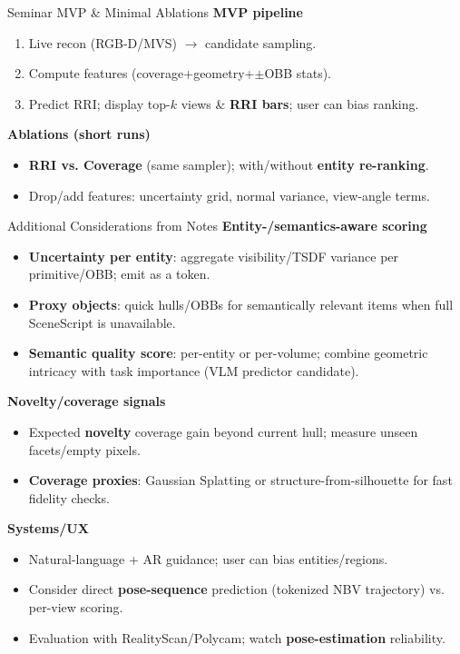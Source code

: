 \documentclass[10pt,aspectratio=169]{beamer}
\begin{document}
\begin{frame}{Seminar MVP \& Minimal Ablations}
\textbf{MVP pipeline}
\begin{enumerate}
  \item Live recon (RGB-D/MVS) $\rightarrow$ candidate sampling.
  \item Compute features (coverage+geometry+$\pm$OBB stats).
  \item Predict RRI; display top-$k$ views \& \textbf{RRI bars}; user can bias ranking.
\end{enumerate}
\textbf{Ablations (short runs)}
\begin{itemize}
  \item \textbf{RRI vs. Coverage} (same sampler); with/without \textbf{entity re-ranking}.
  \item Drop/add features: uncertainty grid, normal variance, view-angle terms.
\end{itemize}
\end{frame}

\begin{frame}{Additional Considerations from Notes}
\textbf{Entity-/semantics-aware scoring}
\begin{itemize}
  \item \textbf{Uncertainty per entity}: aggregate visibility/TSDF variance per primitive/OBB; emit as a token.
  \item \textbf{Proxy objects}: quick hulls/OBBs for semantically relevant items when full SceneScript is unavailable.
  \item \textbf{Semantic quality score}: per-entity or per-volume; combine geometric intricacy with task importance (VLM predictor candidate).
\end{itemize}
\textbf{Novelty/coverage signals}
\begin{itemize}
  \item Expected \textbf{novelty} \/ coverage gain beyond current hull; measure unseen facets/empty pixels.
  \item \textbf{Coverage proxies}: Gaussian Splatting or structure-from-silhouette for fast fidelity checks.
\end{itemize}
\textbf{Systems/UX}
\begin{itemize}
  \item Natural-language + AR guidance; user can bias entities/regions.
  \item Consider direct \textbf{pose-sequence} prediction (tokenized NBV trajectory) vs. per-view scoring.
  \item Evaluation with RealityScan/Polycam; watch \textbf{pose-estimation} reliability.
\end{itemize}
\end{frame}
\end{document}
